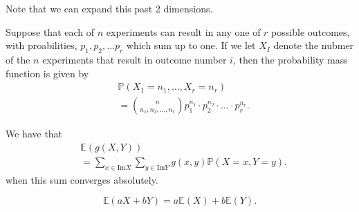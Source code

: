 Note that we can expand this past 2 dimensions.

\begin{definition}
	Suppose that each of \( n \) experiments can result in any one of \( r \) possible outcomes, with proabilities, \( p_{1}, p_{2}, \ldots p_r \) which sum up to one. If we let \( X_I \) denote the nubmer of the \( n \) experiments that result in outcome number \( i \), then the probability mass function is given by 
	\begin{align*}
		&\mathbb{P}(X_{1}=n_{1},\ldots ,X_r=n_r) \\ &= \binom{n}{n_{1},n_{2},\ldots ,n_r} p_{1}^{n_{1}}  \cdot p_{2}^{n_{2}}  \cdot \ldots \cdot p_r^{n_r} 
	.\end{align*}
\end{definition}

\begin{definition}
	We have that
	\begin{align*}
		&\mathbb{E}(g(X,Y)) \\ &= \sum_{x \in \text{Im}X} \sum_{y \in \text{Im}Y} g(x,y)\mathbb{P}(X=x,Y=y)
	.\end{align*}
	when this sum converges absolutely.
\end{definition}

\begin{corollary}
	\[
		\mathbb{E}(aX + bY) = a\mathbb{E}(X) + b\mathbb{E}(Y)
	.\] 
\end{corollary}
